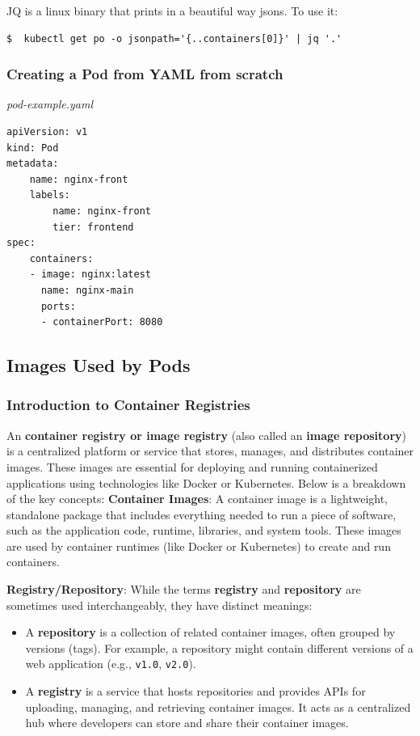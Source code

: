\documentclass{article}
\newenvironment{blocktemplateI}[1]{%
    \tcolorbox[beamer,%
    noparskip,breakable,
    colframe=Violet,%
    colbacklower=Black,%
    title=#1]}%
    {\endtcolorbox}
\newenvironment{codetemplate}[1][]{%
  \mybasecolorbox[#1]
  \itshape
}{%
  \endmybasecolorbox
}
\begin{document}
\begin{blocktemplateI}{JQ}
JQ is a linux binary that prints in a beautiful way jsons. To use it:

\begin{codetemplate}{}
\begin{verbatim}
$  kubectl get po -o jsonpath='{..containers[0]}' | jq '.'
\end{verbatim}
\end{codetemplate}
\end{blocktemplateI}

\subsubsection{Creating a Pod from YAML from scratch}

\begin{codetemplate}{pod-example.yaml}
\begin{verbatim}
apiVersion: v1
kind: Pod
metadata:
    name: nginx-front
    labels:
        name: nginx-front
        tier: frontend
spec:
    containers: 
    - image: nginx:latest
      name: nginx-main
      ports:
      - containerPort: 8080
\end{verbatim}
\end{codetemplate}

\subsection{Images Used by Pods}

\subsubsection{Introduction to Container Registries}
An \textbf{container registry or image registry} (also called an \textbf{image repository}) is a centralized platform or service that stores, manages, and distributes container images. These images are essential for deploying and running containerized applications using technologies like Docker or Kubernetes. Below is a breakdown of the key concepts:
\textbf{Container Images}: A container image is a lightweight, standalone package that includes everything needed to run a piece of software, such as the application code, runtime, libraries, and system tools. These images are used by container runtimes (like Docker or Kubernetes) to create and run containers.
    
\textbf{Registry/Repository}: While the terms \textbf{registry} and \textbf{repository} are sometimes used interchangeably, they have distinct meanings:
\begin{itemize}
    \item A \textbf{repository} is a collection of related container images, often grouped by versions (tags). For example, a repository might contain different versions of a web application (e.g., \texttt{v1.0}, \texttt{v2.0}).
    \item A \textbf{registry} is a service that hosts repositories and provides APIs for uploading, managing, and retrieving container images. It acts as a centralized hub where developers can store and share their container images.
\end{itemize}
    
\end{document}

